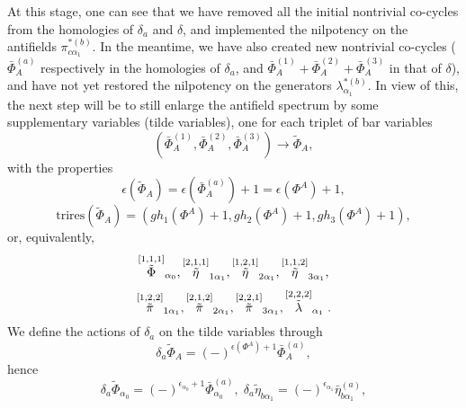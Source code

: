 \documentclass[a4paper,12pt]{article}
\begin{document}
At this stage, one can see that we have removed all the initial nontrivial
co-cycles from the homologies of $\delta _{a}$ and $\delta $, and
implemented the nilpotency on the antifields $\pi _{c\alpha _{1}}^{*(b)}$.
In the meantime, we have also created new nontrivial co-cycles ($\bar{\Phi}%
_{A}^{(a)}$ respectively in the homologies of $\delta _{a}$, and $\bar{\Phi}%
_{A}^{(1)}+\bar{\Phi}_{A}^{(2)}+\bar{\Phi}_{A}^{(3)}$ in that of $\delta $),
and have not yet restored the nilpotency on the generators $\lambda _{\alpha
_{1}}^{*(b)}$. In view of this, the next step will be to still enlarge the
antifield spectrum by some supplementary variables (tilde variables), one
for each triplet of bar variables 
\begin{equation}
\left( \bar{\Phi}_{A}^{(1)},\bar{\Phi}_{A}^{(2)},\bar{\Phi}_{A}^{(3)}\right)
\rightarrow \tilde{\Phi}_{A},  \label{sp3.50}
\end{equation}
with the properties 
\begin{equation}
\epsilon \left( \tilde{\Phi}_{A}\right) =\epsilon \left( \bar{\Phi}%
_{A}^{(a)}\right) +1=\epsilon \left( \Phi ^{A}\right) +1,  \label{sp3.51}
\end{equation}
\begin{equation}
\mathrm{trires}\left( \tilde{\Phi}_{A}\right) =\left( gh_{1}\left( \Phi
^{A}\right) +1,gh_{2}\left( \Phi ^{A}\right) +1,gh_{3}\left( \Phi
^{A}\right) +1\right) ,  \label{sp3.52}
\end{equation}
or, equivalently, 
\begin{equation}
\stackrel{\left[ 1,1,1\right] }{\tilde{\Phi}}_{\alpha _{0}},\stackrel{\left[
2,1,1\right] }{\tilde{\eta}}_{1\alpha _{1}},\stackrel{\left[ 1,2,1\right] }{%
\tilde{\eta}}_{2\alpha _{1}},\stackrel{\left[ 1,1,2\right] }{\tilde{\eta}}%
_{3\alpha _{1}},  \label{sp3.53}
\end{equation}
\begin{equation}
\stackrel{\left[ 1,2,2\right] }{\tilde{\pi}}_{1\alpha _{1}},\stackrel{\left[
2,1,2\right] }{\tilde{\pi}}_{2\alpha _{1}},\stackrel{\left[ 2,2,1\right] }{%
\tilde{\pi}}_{3\alpha _{1}},\stackrel{\left[ 2,2,2\right] }{\tilde{\lambda}}%
_{\alpha _{1}}.  \label{sp3.54}
\end{equation}
We define the actions of $\delta _{a}$ on the tilde variables through 
\begin{equation}
\delta _{a}\tilde{\Phi}_{A}=\left( -\right) ^{\epsilon \left( \Phi
^{A}\right) +1}\bar{\Phi}_{A}^{(a)},  \label{sp3.55}
\end{equation}
hence 
\begin{equation}
\delta _{a}\tilde{\Phi}_{\alpha _{0}}=\left( -\right) ^{\epsilon _{\alpha
_{0}}+1}\bar{\Phi}_{\alpha _{0}}^{(a)},\;\delta _{a}\tilde{\eta}_{b\alpha
_{1}}=\left( -\right) ^{\epsilon _{\alpha _{1}}}\bar{\eta}_{b\alpha
_{1}}^{(a)},  \label{sp3.56}
\end{equation}
\end{document}
